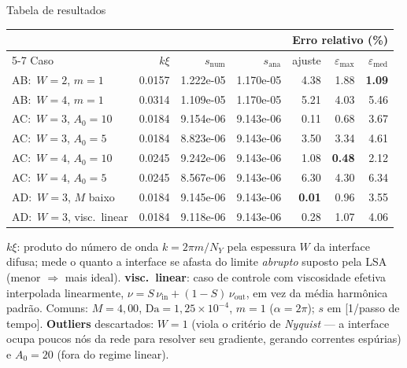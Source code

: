 \documentclass[aspectratio=169,11pt]{beamer}
\newcommand{\Da}{\mathrm{Da}}
\newcommand{\snum}{s_{\mathrm{num}}}
\newcommand{\sana}{s_{\mathrm{ana}}}
\begin{document}
\begin{frame}{Tabela de resultados}
  \begin{table}
    \centering
    \scriptsize
    \setlength{\tabcolsep}{6pt}
    \renewcommand{\arraystretch}{1.2}
    \begin{tabular}{l r r r r r r}
      \toprule
      & & & & \multicolumn{3}{c}{Erro relativo (\%)} \\
      \cmidrule(lr){5-7}
      Caso & $k\xi$ & $\snum$ & $\sana$ & ajuste & $\varepsilon_{\max}$ & $\varepsilon_{\mathrm{med}}$ \\
      \midrule
      AB:\ $W{=}2$, $m{=}1$        & 0.0157 & 1.222e-05 & 1.170e-05 & 4.38 & 1.88 & \textbf{1.09} \\
      AB:\ $W{=}4$, $m{=}1$        & 0.0314 & 1.109e-05 & 1.170e-05 & 5.21 & 4.03 & 5.46 \\
      \addlinespace
      AC:\ $W{=}3$, $A_0{=}10$     & 0.0184 & 9.154e-06 & 9.143e-06 & 0.11 & 0.68 & 3.67 \\
      AC:\ $W{=}3$, $A_0{=}5$      & 0.0184 & 8.823e-06 & 9.143e-06 & 3.50 & 3.34 & 4.61 \\
      AC:\ $W{=}4$, $A_0{=}10$     & 0.0245 & 9.242e-06 & 9.143e-06 & 1.08 & \textbf{0.48} & 2.12 \\
      AC:\ $W{=}4$, $A_0{=}5$      & 0.0245 & 8.567e-06 & 9.143e-06 & 6.30 & 4.30 & 6.34 \\
      \addlinespace
      AD:\ $W{=}3$, $M$ baixo      & 0.0184 & 9.145e-06 & 9.143e-06 & \textbf{0.01} & 0.96 & 3.55 \\
      AD:\ $W{=}3$, visc.\ linear  & 0.0184 & 9.118e-06 & 9.143e-06 & 0.28 & 1.07 & 4.06 \\
      \bottomrule
    \end{tabular}
  \end{table}
  \vspace{0.2em}
  \scriptsize
  \textbf{$k\xi$}: produto do número de onda $k=2\pi m/N_Y$ pela espessura $W$
  da interface difusa; mede o quanto a interface se afasta do limite
  \emph{abrupto} suposto pela LSA (menor $\Rightarrow$ mais ideal).\;
  \textbf{visc.\ linear}: caso de controle com viscosidade efetiva interpolada
  linearmente, $\nu=S\,\nu_{\mathrm{in}}+(1-S)\,\nu_{\mathrm{out}}$, em vez da
  média harmônica padrão.\;
  Comuns: $M=4{,}00$, $\Da=1{,}25\times10^{-4}$, $m=1$ ($\alpha=2\pi$);
  $s$ em [1/passo de tempo].\;
  \textbf{Outliers} descartados: $W{=}1$ (viola o critério de \emph{Nyquist} —
  a interface ocupa poucos nós da rede para resolver seu gradiente, gerando
  correntes espúrias) e $A_0{=}20$ (fora do regime linear).
\end{frame}
\end{document}
